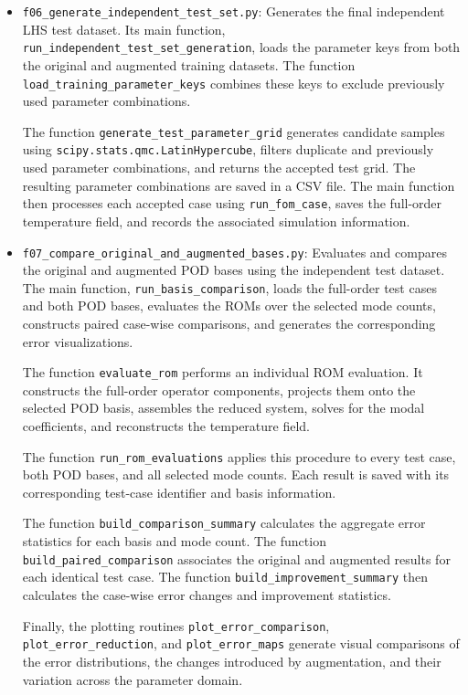 \begin{itemize}

    \item \texttt{f06\_generate\_independent\_test\_set.py}:
    Generates the final independent LHS test dataset.
    Its main function,
    \texttt{run\_independent\_test\_set\_generation},
    loads the parameter keys from both the original
    and augmented training datasets. The function
    \texttt{load\_training\_parameter\_keys} combines
    these keys to exclude previously used parameter
    combinations.

    The function \texttt{generate\_test\_parameter\_grid}
    generates candidate samples using
    \texttt{scipy.stats.qmc.LatinHypercube}, filters
    duplicate and previously used parameter
    combinations, and returns the accepted test grid.
    The resulting parameter combinations are saved
    in a CSV file. The main function then processes
    each accepted case using \texttt{run\_fom\_case},
    saves the full-order temperature field, and
    records the associated simulation information.

    \item \texttt{f07\_compare\_original\_and\_augmented\_bases.py}:
    Evaluates and compares the original and augmented
    POD bases using the independent test dataset.
    The main function, \texttt{run\_basis\_comparison},
    loads the full-order test cases and both POD bases,
    evaluates the ROMs over the selected mode counts,
    constructs paired case-wise comparisons, and
    generates the corresponding error visualizations.

    The function \texttt{evaluate\_rom} performs an
    individual ROM evaluation. It constructs the
    full-order operator components, projects them
    onto the selected POD basis, assembles the
    reduced system, solves for the modal coefficients,
    and reconstructs the temperature field.

    The function \texttt{run\_rom\_evaluations}
    applies this procedure to every test case, both
    POD bases, and all selected mode counts. Each
    result is saved with its corresponding test-case
    identifier and basis information.

    The function \texttt{build\_comparison\_summary}
    calculates the aggregate error statistics for
    each basis and mode count. The function
    \texttt{build\_paired\_comparison} associates
    the original and augmented results for each
    identical test case. The function
    \texttt{build\_improvement\_summary} then
    calculates the case-wise error changes and
    improvement statistics.

    Finally, the plotting routines
    \texttt{plot\_error\_comparison},
    \texttt{plot\_error\_reduction}, and
    \texttt{plot\_error\_maps} generate visual
    comparisons of the error distributions, the
    changes introduced by augmentation, and their
    variation across the parameter domain.

\end{itemize}

